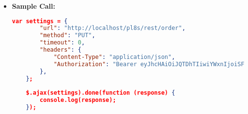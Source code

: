 \begin{itemize}
    \item \textbf{Sample Call:}
		\begin{lstlisting}[language=json]		
	var settings = {
		"url": "http://localhost/pl8s/rest/order",
		"method": "PUT",
		"timeout": 0,
		"headers": {
			"Content-Type": "application/json",
			"Authorization": "Bearer eyJhcHAiOiJQTDhTIiwiYWxnIjoiSFM1MTIifQ.eyJ1aWQiOjMsInJvbCI6ImN1c3RvbWVyIiwic3RyI joiY3VzX1B3OHJKbmd5eldOcmZ5IiwiZGF0IjoxNzE0M zQyNjAxNjMwfQ.RrH8ojpudntUVEZVnbvVw 1GpUEU56tdnhnCSrnCqoHgUAwMMxXJDcTMfKazQm rIZ_OSfges7-lECny6p-t5ITA"
		},
	};
	
	$.ajax(settings).done(function (response) {
		console.log(response);
	});
	\end{lstlisting}
  \end{itemize}		
